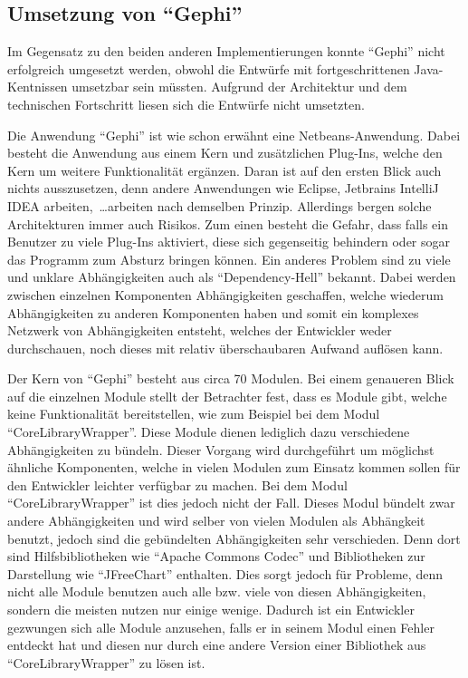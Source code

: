 \subsection{Umsetzung von \enquote{Gephi}}
Im Gegensatz zu den beiden anderen Implementierungen konnte \enquote{Gephi}
nicht erfolgreich umgesetzt werden, obwohl die Entwürfe mit fortgeschrittenen
Java-Kentnissen umsetzbar sein müssten. Aufgrund der Architektur und dem
technischen Fortschritt liesen sich die Entwürfe nicht umsetzten.

Die Anwendung \enquote{Gephi} ist wie schon erwähnt eine Netbeans-Anwendung.
Dabei besteht die Anwendung aus einem Kern und zusätzlichen Plug-Ins, welche den
Kern um weitere Funktionalität ergänzen. Daran ist auf den ersten Blick auch
nichts ausszusetzen, denn andere Anwendungen wie Eclipse,
Jetbrains IntelliJ IDEA arbeiten,~\dots arbeiten nach demselben Prinzip.
Allerdings bergen solche Architekturen immer auch Risikos. Zum einen besteht die
Gefahr, dass falls ein Benutzer zu viele Plug-Ins aktiviert, diese sich
gegenseitig behindern oder sogar das Programm zum Absturz bringen
können. Ein anderes Problem sind zu viele und unklare Abhängigkeiten auch als
\enquote{Dependency-Hell} bekannt. Dabei werden zwischen einzelnen
Komponenten Abhängigkeiten geschaffen, welche wiederum Abhängigkeiten zu anderen
Komponenten haben und somit ein komplexes Netzwerk von Abhängigkeiten entsteht,
welches der Entwickler weder durchschauen, noch dieses mit relativ überschaubaren
Aufwand auflösen kann.

Der Kern von \enquote{Gephi} besteht aus circa 70 Modulen. Bei einem genaueren
Blick auf die einzelnen Module stellt der Betrachter fest, dass es Module gibt,
welche keine Funktionalität bereitstellen, wie zum Beispiel bei dem Modul
\enquote{CoreLibraryWrapper}. Diese Module dienen lediglich dazu verschiedene
Abhängigkeiten zu bündeln. Dieser Vorgang wird durchgeführt um möglichst ähnliche
Komponenten, welche in vielen Modulen zum Einsatz kommen sollen für den Entwickler
leichter verfügbar zu machen. Bei dem Modul \enquote{CoreLibraryWrapper} ist
dies jedoch nicht der Fall. Dieses Modul bündelt zwar andere Abhängigkeiten und
wird selber von vielen Modulen als Abhängkeit benutzt, jedoch sind die
gebündelten Abhängigkeiten sehr verschieden. Denn dort sind Hilfsbibliotheken
wie \enquote{Apache Commons Codec} und Bibliotheken zur Darstellung wie
\enquote{JFreeChart} enthalten. Dies sorgt jedoch für Probleme, denn nicht alle
Module benutzen auch alle bzw. viele von diesen Abhängigkeiten, sondern die meisten
nutzen nur einige wenige. Dadurch ist ein Entwickler gezwungen sich alle Module
anzusehen, falls er in seinem Modul einen Fehler entdeckt hat und diesen nur
durch eine andere Version einer Bibliothek aus \enquote{CoreLibraryWrapper} zu
lösen ist.

